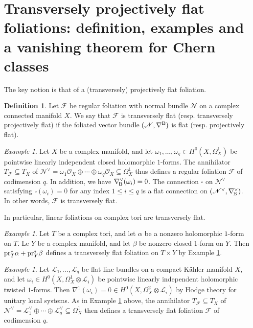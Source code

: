 \documentclass[english,10pt]{amsart}
\newcommand{\nablaBott}{\nabla_{\! \textup{B}}}
\renewcommand{\le}{\leqslant}
\newcommand{\cF}{\mathcal{F}}
\newcommand{\sL}{\mathscr{L}}
\newcommand{\sN}{\mathscr{N}}
\newcommand{\sO}{\mathscr{O}}
\theoremstyle{definition}
\newtheorem{defn}[thm]{Definition}
\theoremstyle{remark}
\newtheorem{exmp}[thm]{Example}
\numberwithin{equation}{section}
\begin{document}
\section{Transversely projectively flat foliations: definition, examples and a vanishing theorem for Chern classes}\label{section:definition}

The key notion is that of a (transversely) projectively flat foliation.

\begin{defn}
Let $\cF$ be regular foliation with normal bundle $\sN$ on a complex connected manifold $X$. We say that $\cF$ is transversely flat (resp. transversely projectively flat) if the foliated vector bundle $(\sN,\nabla^\textup{B})$ is flat (resp. projectively flat).
\end{defn}

\begin{exmp}\label{example:linear_foliation}
Let $X$ be a complex manifold, and let $\omega_1,\ldots,\omega_q \in H^0(X,\Omega^1_X)$ be pointwise linearly independent closed holomorphic $1$-forms. The annihilator $T_\cF \subseteq T_X$ of $\sN^\vee=\omega_1\sO_X \oplus \cdots \oplus \omega_q \sO_X \subseteq \Omega_X^1$ thus defines a regular foliation $\cF$ of codimension $q$. In addition, we have $\nablaBott^\vee(\omega_i)=0$. The connection $\square$ on $\sN^\vee$ satisfying $\square(\omega_i)=0$ for any index $1 \le i \le q$ is a flat connection on $(\sN^\vee,\nablaBott^\vee)$. In other words, $\cF$ is transversely flat.

\medskip

In particular, linear foliations on complex tori are transversely flat.
\end{exmp}

\begin{exmp}
Let $T$ be a complex tori, and let $\alpha$ be a nonzero holomorphic $1$-form on $T$. Le $Y$ be a complex manifold, and let $\beta$ be nonzero closed $1$-form on $Y$. Then $\textup{pr}_T^* \alpha+ \textup{pr}_Y^*\beta$ defines a transversely flat foliation on $T \times Y$ by Example \ref{example:linear_foliation}.
\end{exmp}


\begin{exmp}
Let $\sL_1,\ldots,\sL_q$ be flat line bundles on a compact Kähler manifold $X$, and let $\omega_i \in H^0(X,\Omega^1_X\otimes \sL_i)$ be pointwise linearly independent holomorphic twisted $1$-forms. Then $\nabla^1(\omega_i)=0 \in H^0(X,\Omega_X^2\otimes \sL_i)$ by Hodge theory for unitary local systems. 
As in Example \ref{example:linear_foliation} above, the annihilator $T_\cF \subseteq T_X$ of $\sN^\vee=\sL_1^\vee \oplus \cdots \oplus \sL_q^\vee \subseteq \Omega_X^1$ then defines a transversely flat foliation $\cF$ of codimension $q$.
\end{exmp}
\end{document}
